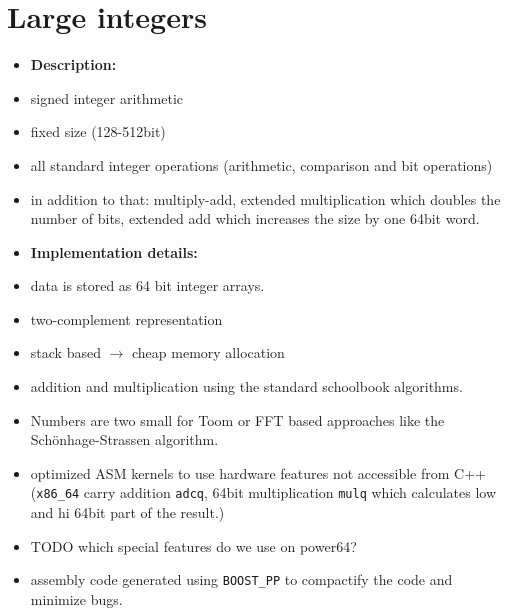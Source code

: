 \documentclass[oribibl]{llncs2e/llncs}
\begin{document}

\section{Large integers}
\begin{itemize}
\item {\bf Description:}
\item signed integer arithmetic
\item fixed size (128-512bit)
\item all standard integer operations (arithmetic, comparison and bit operations)
\item in addition to that: multiply-add, extended multiplication which doubles the number of bits, extended add which increases the size by one 64bit word.
\item {\bf Implementation details:}
\item data is stored as 64 bit integer arrays.
\item two-complement representation
\item stack based $\rightarrow$ cheap memory allocation
\item addition and multiplication using the standard schoolbook algorithms.
\item Numbers are two small for Toom\cite{Toom} or FFT based approaches like the Sch\"onhage-Strassen algorithm\cite{Schonhage}.
\item optimized ASM kernels to use hardware features not accessible from C++ (\verb|x86_64| carry addition \verb|adcq|, 64bit multiplication \verb|mulq| which calculates low and hi 64bit part of the result.)
\item TODO which special features do we use on power64?
\item assembly code generated using \verb|BOOST_PP| to compactify the code and minimize bugs.
\end{itemize}
\end{document}
